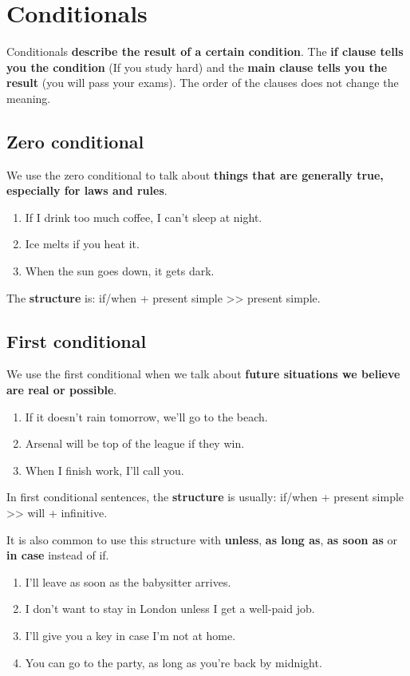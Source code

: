 \documentclass{article}
\begin{document}
\pagebreak
\section{Conditionals}

Conditionals \textbf{describe the result of a certain condition}. The \textbf{if clause tells you the condition} (If you study hard) and the \textbf{main clause tells you the result} (you will pass your exams). The order of the clauses does not change the meaning.

\subsection{Zero conditional}

We use the zero conditional to talk about \textbf{things that are generally true, especially for laws and rules}.

\begin{enumerate}
	\item If I drink too much coffee, I can't sleep at night.
	\item Ice melts if you heat it.
	\item When the sun goes down, it gets dark.
\end{enumerate}

The \textbf{structure} is: if/when + present simple >> present simple.

\subsection{First conditional}

We use the first conditional when we talk about \textbf{future situations we believe are real or possible}.

\begin{enumerate}
	\item If it doesn't rain tomorrow, we'll go to the beach.
	\item Arsenal will be top of the league if they win.
	\item When I finish work, I'll call you.
\end{enumerate}

In first conditional sentences, the \textbf{structure} is usually: if/when + present simple >> will + infinitive. 

It is also common to use this structure with \textbf{unless}, \textbf{as long as}, \textbf{as soon as} or \textbf{in case} instead of if.

\begin{enumerate}
	\item I'll leave as soon as the babysitter arrives.
	\item I don't want to stay in London unless I get a well-paid job.
	\item I'll give you a key in case I'm not at home.
	\item You can go to the party, as long as you're back by midnight.
\end{enumerate}
\end{document}
